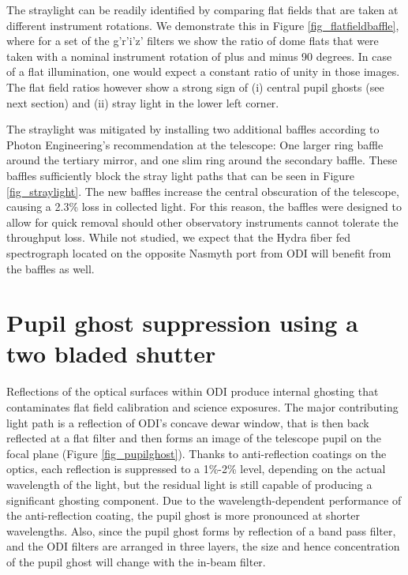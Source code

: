\documentclass[]{spieman}
\begin{document}
The straylight  can be readily identified by comparing flat fields that are
taken at different instrument rotations. We demonstrate this in Figure
\ref{fig_flatfieldbaffle}, where for a set of the g'r'i'z' filters we show the
ratio of dome flats that were taken with a nominal instrument rotation of plus
and minus 90 degrees.  In case of a flat illumination, one would expect a
constant ratio of unity in those images. The flat field ratios however show a
strong sign of (i) central pupil ghosts (see next section) and (ii) stray light
in the lower left corner.

The straylight was mitigated by installing two additional baffles according to
Photon Engineering's recommendation  at the telescope: One larger ring baffle
around the tertiary mirror, and one slim ring around the secondary baffle. These
baffles sufficiently block the stray light paths that can be seen in Figure
\ref{fig_straylight}. The new baffles increase the central obscuration of the
telescope, causing a 2.3\% loss in collected light. For this reason, the baffles
were designed to allow for quick removal should other observatory instruments
cannot tolerate the throughput loss. While not studied, we expect that the Hydra
fiber fed spectrograph located on the opposite Nasmyth port from ODI will
benefit from the baffles as well.


\section{Pupil ghost suppression using a two bladed shutter}
\label{sect_ghost}

Reflections of the optical surfaces within ODI produce internal ghosting that
contaminates flat field calibration and science exposures. The major contributing
light path is a reflection of ODI’s concave dewar window, that is then back
reflected at a flat filter and then forms an image of the telescope pupil on the
focal plane (Figure \ref{fig_pupilghost}).  Thanks to anti-reflection coatings
on the optics, each reflection is suppressed to a 1\%-2\% level,
depending on the actual wavelength of the light, but the residual light is still
capable of producing a significant ghosting component. Due to the
wavelength-dependent performance of the anti-reflection coating, the pupil ghost
is more pronounced at shorter wavelengths. Also, since the pupil ghost forms by
reflection of a band pass filter, and the ODI filters are arranged in three
layers, the size and hence concentration of the pupil ghost will change with the
in-beam filter.
\end{document}
